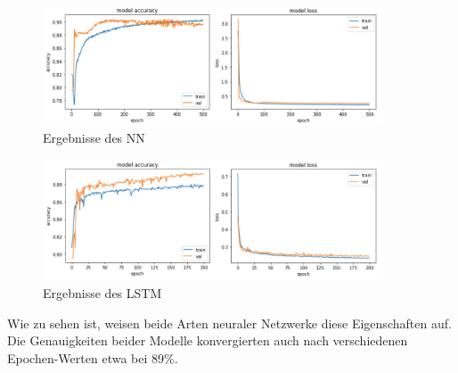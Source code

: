 \begin{figure}[h]
    \centering
    \includegraphics[width=0.9\textwidth]{pic/eval_NN.png}
    \caption{Ergebnisse des NN}
    \label{fig:PT_eval}
\end{figure}

\begin{figure}[h]
    \centering
    \includegraphics[width=0.9\textwidth]{pic/eval_LSTM.png}
    \caption{Ergebnisse des LSTM}
    \label{fig:PT_eval}
\end{figure}

Wie zu sehen ist, weisen beide Arten neuraler Netzwerke diese Eigenschaften auf. Die Genauigkeiten beider Modelle
konvergierten auch nach verschiedenen Epochen-Werten etwa bei 89\%.
